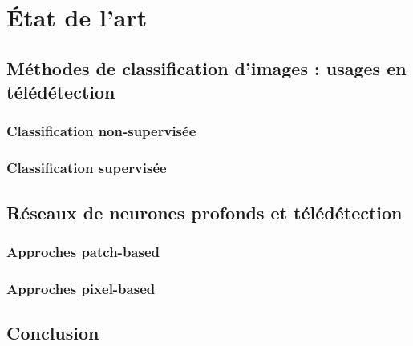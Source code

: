 
\chapter{\'Etat de l'art} %
\PartialToc
\label{Chapter2} %


\section{M\'ethodes de classification d'images : usages en t\'el\'ed\'etection}
\subsection{Classification non-supervis\'ee}
\subsection{Classification supervis\'ee}
\section{R\'eseaux de neurones profonds et t\'el\'ed\'etection}
\subsection{Approches patch-based}
\subsection{Approches pixel-based}
\section{Conclusion}